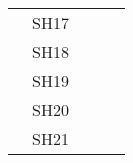 \documentclass[10pt,letterpaper,oneside]{article}
\begin{document}
\begin{table}[]
\begin{tabular}{lllll}
			& SH17                                 &                                   &                                                        &                                                                                                                                         \\
			& SH18                                 &                                   &                                                        &                                                                                                                                         \\
			& SH19                                 &                                   &                                                        &                                                                                                                                         \\
			& SH20                                 &                                   &                                                        &                                                                                                                                         \\
			& SH21                                 &                                   &                                                        &                                                                                                                                        
		\end{tabular}
	\end{table}
\end{document}
